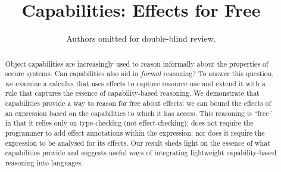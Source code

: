 \documentclass[a4paper,UKenglish]{lipics-v2016}
\title{Capabilities: Effects for Free}
\author{Authors omitted for double-blind review.}
\begin{document}
\maketitle

\begin{abstract}
Object capabilities are increasingly used to reason informally about the properties of secure systems. Can capabilities also aid in \textit{formal} reasoning? To answer this question, we examine a calculus that uses effects to capture resource use and extend it with a rule that captures the essence of capability-based reasoning. We demonstrate that capabilities provide a way to reason for free about effects: we can bound the effects of an expression based on the capabilities to which it has access.  This reasoning is ``free'' in that it relies only on type-checking (not effect-checking); does not require the programmer to add effect annotations within the expression; nor does it require the expression to be analysed for its effects. Our result sheds light on the essence of what capabilities provide and suggests useful ways of integrating lightweight capability-based reasoning into languages.
\end{abstract}











\appendix
% 
\end{document}
